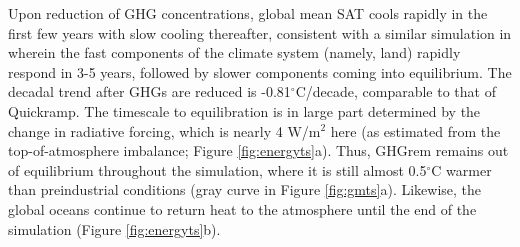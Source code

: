 \documentclass[grl]{AGUTeX}  %
\begin{document}
\begin{article}
Upon reduction of GHG concentrations, global mean SAT cools rapidly in the first few years with slow cooling thereafter, consistent with a similar simulation in \citet{held10} wherein the fast components of the climate system (namely, land) rapidly respond in 3-5 years, followed by slower components coming into equilibrium. The decadal trend after GHGs are reduced is -0.81$^\circ$C/decade, comparable to that of Quickramp. The timescale to equilibration is in large part determined by the change in radiative forcing, which is nearly 4 W/m$^2$ here (as estimated from the top-of-atmosphere imbalance; Figure \ref{fig:energyts}a). Thus, GHGrem remains out of equilibrium throughout the simulation, where it is still almost 0.5$^\circ$C warmer than preindustrial conditions (gray curve in Figure \ref{fig:gmts}a). Likewise, the global oceans continue to return heat to the atmosphere until the end of the simulation (Figure \ref{fig:energyts}b).


\end{article}
\end{document}

